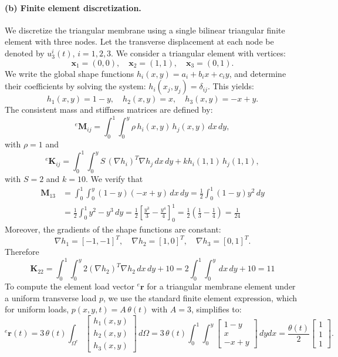 \documentclass[12pt]{article}
\begin{document}
\paragraph*{(b) Finite element discretization.} We discretize the triangular membrane using a single bilinear triangular finite element with three nodes. Let the transverse displacement at each node be denoted by \( u_3^i(t) \), \( i = 1,2,3 \). We consider a triangular element with vertices:
\[
	\mathbf{x}_1 = (0,0), \quad \mathbf{x}_2 = (1,1), \quad \mathbf{x}_3 = (0,1).
\]
We write the global  shape functions \( h_i(x, y) = a_i + b_i x + c_i y \), and determine their coefficients by solving the system: $h_i(x_j, y_j) = \delta_{ij}$. This yields:
\[
	h_1(x,y)  = 1 - y, \quad
	h_2(x,y)  = x,     \quad
	h_3(x,y)  = -x+y.
\]
The consistent mass and stiffness matrices are defined by:
\[
	{}^e\mathbf{M}_{ij} = \int_0^1\int_0^y \rho \, h_i(x,y) \, h_j(x,y) \, dx\, dy,
\]
with $\rho = 1$ and
\[
	{}^e\mathbf{K}_{ij} = \int_0^1\int_0^y S \, (\nabla h_i)^T\nabla h_j \, dx\, dy + k h_i(1,1) \, h_j(1,1),
\]
with $S = 2$ and $k=10$. We verify that
$$
	\begin{aligned}
		\mathbf M_{13} & = \int_0^1 \int_0^y (1 - y)(-x+y) \, dx\, dy
		= \frac{1}{2}\int_0^1 (1 - y) y^2 \, dy                       \\
		               & = \frac{1}{2}\int_0^1 y^2-y^3 \, dy
		=  \frac{1}{2}\left[ \frac{y^3}{3} - \frac{y^4}{4} \right]_0^1
		=  \frac{1}{2}\left(\frac{1}{3} - \frac{1}{4}\right)  = \frac{1}{24}
	\end{aligned}
$$
Moreover, the gradients of the shape functions are constant:
\[
	\nabla h_1  = [-1, -1]^T, \quad \nabla h_2  = [1, 0]^T,   \quad
	\nabla h_3  = [0, 1]^T.
\]
Therefore
$$
	\mathbf K_{22} = \int_0^1 \int_0^y 2(\nabla h_2)^T\nabla h_2 \, dx \, dy
	+ 10 = 2\int_0^1 \int_0^y \, dx\, dy  + 10  = 11
$$
To compute the element load vector ${}^e\mathbf{r}$ for a triangular membrane element under a uniform transverse load $p$, we use the standard finite element expression, which for uniform loads, $p(x, y, t) = A \, \theta(t)$ with $A = 3$, simplifies to:
$${}^e\mathbf{r}(t) = 3 \, \theta(t) \int_{\Omega^e}
	\begin{bmatrix}
		h_1(x, y) \\
		h_2(x, y) \\
		h_3(x, y)
	\end{bmatrix}
	\, d\Omega=3 \, \theta(t) \int_0^1 \int_0^y   \begin{bmatrix}
		1-y \\
		x   \\
		-x+y
	\end{bmatrix} \, dydx =   \frac{\theta(t)}{2}\begin{bmatrix}
		1 \\
		1 \\
		1
	\end{bmatrix}.$$
\end{document}
